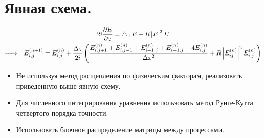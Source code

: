 \section{Явная схема.}
\begin{multline*}
	2i\frac{\partial E}{\partial z}=\triangle_\perp E + R\left|E\right|^2E \\
	{\hbox to 0.7cm{\rightarrowfill}}\quad
	E_{i,j}^{(n+1)}=E_{i,j}^{(n)}+\frac{\Delta z}{2i}
	\left(\frac{E_{i,j+1}^{(n)} + E_{i,j-1}^{(n)} + E_{i+1,j}^{(n)} + E_{i-1,j}^{(n)} - 
	4E_{i,j}^{(n)}}{\Delta x^2} + R\left|E_{ij,}^{(n)}\right|^2E_{i,j}^{(n)}
	\right)
\end{multline*}

\begin{itemize}
	\item  Не используя метод расщепления по физическим факторам, реализовать приведенную 
		выше явную схему.
	\item Для численного интегрирования уравнения использовать метод Рунге-Кутта четвертого
		порядка точности.
	\item Использовать блочное распределение матрицы между процессами.
\end{itemize}

